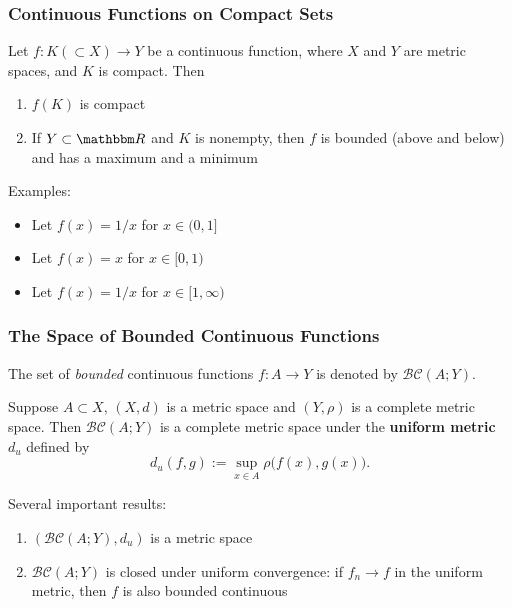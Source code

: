 \documentclass[9pt,aspectratio=169]{beamer}
\newcommand{\cC}{\mathcal C}
\newcommand{\bB}{\mathcal B}
\newcommand{\RR}{\mathbbm R}
\begin{document}
\begin{frame}
    \frametitle{Continuous Functions on Compact Sets}
    \begin{theorem}
        Let $f:K(\subset X) \to Y$ be a continuous function, where $X$ and
        $Y$ are metric spaces, and $K$ is compact. Then
        \begin{enumerate}
            \item $f(K)$ is compact
            \item If $Y \subset \RR$ and $K$ is nonempty, then $f$ is bounded
            (above and below) and has a maximum and a minimum
        \end{enumerate}
    \end{theorem}
    Examples:
    \begin{itemize}
        \item Let $f(x) = 1/x$ for $x \in (0, 1]$
        \item Let $f(x) = x$ for $x \in [0, 1)$
        \item Let $f(x) = 1/x$ for $x \in [1, \infty)$
    \end{itemize}
\end{frame}

\begin{frame}
    \frametitle{The Space of Bounded Continuous Functions}
    \begin{definition}
        The set of \emph{bounded} continuous functions $f: A \to Y$ is
        denoted by $\bB\cC(A; Y)$.
    \end{definition}
    \begin{theorem}
        Suppose $A \subset X$, $(X, d)$ is a metric space and $(Y, \rho)$ is
        a complete metric space. Then $\bB\cC(A; Y)$ is a complete metric
        space under the \textbf{uniform metric} $d_u$ defined by
        \begin{equation*}
            d_u(f, g) := \sup_{x \in A}\rho\Big(f(x), g(x)\Big).
        \end{equation*}
    \end{theorem}
    Several important results:
    \begin{enumerate}
        \item $(\bB\cC(A; Y), d_u)$ is a metric space
        \item $\bB\cC(A; Y)$ is closed under uniform convergence: if $f_n \to
        f$ in the uniform metric, then $f$ is also bounded continuous
    \end{enumerate}
\end{frame}
\end{document}
